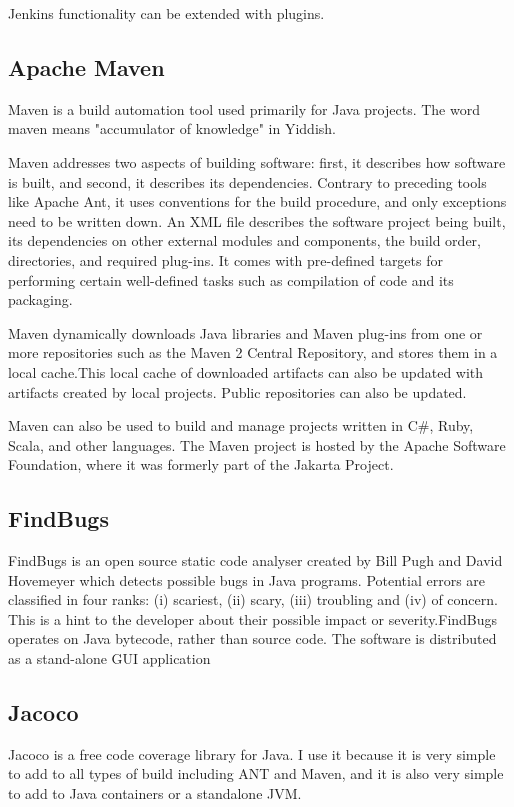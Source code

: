 \documentclass[12pt,a4paper,oneside]{report}
\begin{document}
{Jenkins functionality can be extended with plugins.\\
\subsection{Apache Maven}
Maven is a build automation tool used primarily for Java projects. The word maven means "accumulator of knowledge" in Yiddish.
\par
Maven addresses two aspects of building software: first, it describes how software is built, and second, it describes its dependencies. Contrary to preceding tools like Apache Ant, it uses conventions for the build procedure, and only exceptions need to be written down. An XML file describes the software project being built, its dependencies on other external modules and components, the build order, directories, and required plug-ins. It comes with pre-defined targets for performing certain well-defined tasks such as compilation of code and its packaging.
\par
Maven dynamically downloads Java libraries and Maven plug-ins from one or more repositories such as the Maven 2 Central Repository, and stores them in a local cache.This local cache of downloaded artifacts can also be updated with artifacts created by local projects. Public repositories can also be updated.
\par
Maven can also be used to build and manage projects written in C\#, Ruby, Scala, and other languages. The Maven project is hosted by the Apache Software Foundation, where it was formerly part of the Jakarta Project.
\subsection{FindBugs}
\par
FindBugs is an open source static code analyser created by Bill Pugh and David Hovemeyer which detects possible bugs in Java programs. Potential errors are classified in four ranks: (i) scariest, (ii) scary,   (iii) troubling and (iv) of concern. This is a hint to the developer about their possible impact or severity.FindBugs operates on Java bytecode, rather than source code. The software is distributed as a stand-alone GUI application
\subsection{Jacoco}
\par
Jacoco is a free code coverage library for Java. 
I use it because it is very simple to add to all types of build including ANT and Maven, and it is also very simple to add to Java containers or a standalone JVM.
}
\end{document}
